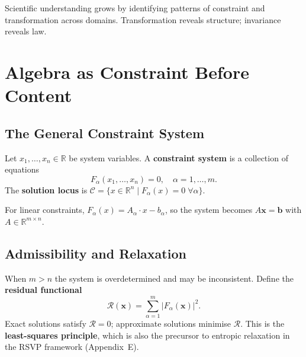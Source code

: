 \documentclass[11pt, openany]{book}
\theoremstyle{plain}
\theoremstyle{definition}
\theoremstyle{remark}
\newcommand{\R}{\mathbb{R}}
\begin{document}
\begin{center}
\end{center}

\begin{principle}
Scientific understanding grows by identifying patterns of constraint and
transformation across domains. Transformation reveals structure; invariance
reveals law.
\end{principle}

\appendix

\chapter{Algebra as Constraint Before Content}

\section{The General Constraint System}

Let $x_1,\dots,x_n\in\R$ be system variables. A \textbf{constraint system}
is a collection of equations
\[
  F_\alpha(x_1,\dots,x_n)=0,\quad\alpha=1,\dots,m.
\]
The \textbf{solution locus} is
$\mathcal{C}=\{x\in\R^n\mid F_\alpha(x)=0\;\forall\alpha\}$.

For linear constraints, $F_\alpha(x)=A_\alpha\cdot x - b_\alpha$, so the
system becomes $A\mathbf{x}=\mathbf{b}$ with $A\in\R^{m\times n}$.

\section{Admissibility and Relaxation}

When $m>n$ the system is overdetermined and may be inconsistent. Define the
\textbf{residual functional}
\[
  \mathcal{R}(\mathbf{x})=\sum_{\alpha=1}^m|F_\alpha(\mathbf{x})|^2.
\]
Exact solutions satisfy $\mathcal{R}=0$; approximate solutions minimise
$\mathcal{R}$. This is the \textbf{least-squares principle}, which is also
the precursor to entropic relaxation in the RSVP framework (Appendix~E).
\end{document}
